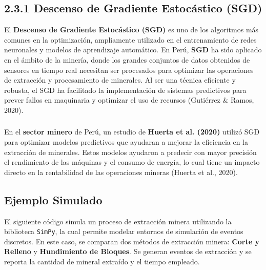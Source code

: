 \documentclass[a5paper]{article}
\begin{document}
	\subsection*{2.3.1 Descenso de Gradiente Estocástico (SGD)}
	
	El \textbf{Descenso de Gradiente Estocástico (SGD)} es uno de los algoritmos más comunes en la optimización, ampliamente utilizado en el entrenamiento de redes neuronales y modelos de aprendizaje automático. En Perú, \textbf{SGD} ha sido aplicado en el ámbito de la minería, donde los grandes conjuntos de datos obtenidos de sensores en tiempo real necesitan ser procesados para optimizar las operaciones de extracción y procesamiento de minerales. Al ser una técnica eficiente y robusta, el SGD ha facilitado la implementación de sistemas predictivos para prever fallos en maquinaria y optimizar el uso de recursos (Gutiérrez \& Ramos, 2020).
	
	\subsubsection*{}
	En el \textbf{sector minero} de Perú, un estudio de \textbf{Huerta et al. (2020)} utilizó SGD para optimizar modelos predictivos que ayudaran a mejorar la eficiencia en la extracción de minerales. Estos modelos ayudaron a predecir con mayor precisión el rendimiento de las máquinas y el consumo de energía, lo cual tiene un impacto directo en la rentabilidad de las operaciones mineras (Huerta et al., 2020).
	
	
	\subsection*{Ejemplo Simulado}
	
	El siguiente código simula un proceso de extracción minera utilizando la biblioteca \texttt{SimPy}, la cual permite modelar entornos de simulación de eventos discretos. En este caso, se comparan dos métodos de extracción minera: \textbf{Corte y Relleno} y \textbf{Hundimiento de Bloques}. Se generan eventos de extracción y se reporta la cantidad de mineral extraído y el tiempo empleado.
	
	
\end{document}
